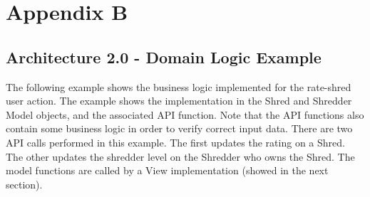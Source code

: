 \chapter{Appendix B}
\section{Architecture 2.0 - Domain Logic Example}
\label{sec:bmodel}
The following example shows the business logic implemented for the rate-shred user action. The example shows the implementation in the Shred and Shredder Model objects, and the associated API function. Note that the API functions also contain some business logic in order to verify correct input data. There are two API calls performed in this example.  The first updates the rating on a Shred. The other updates the shredder level on the Shredder who owns the Shred. The model functions are called by a View implementation (showed in the next section).
